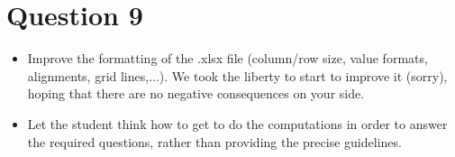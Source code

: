 \documentclass[11pt,a4paper,openany,oneside]{article}%
\begin{document}
\section{Question 9}
\begin{itemize}
    \item Improve the formatting of the {\ttfamily.xlsx} file (column/row size, value formats, alignments, grid lines,...). We took the liberty to start to improve it (sorry), hoping that there are no negative consequences on your side.
    \item Let the student think how to get to do the computations in order to answer the required questions, rather than providing the precise guidelines.
\end{itemize}



%     
    
\end{document}
